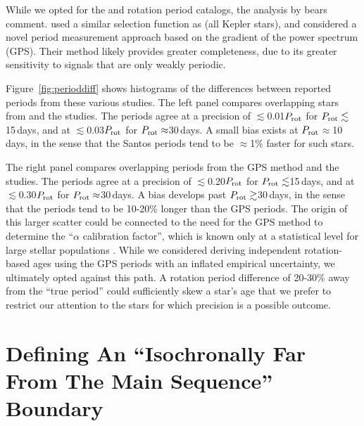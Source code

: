\documentclass[11pt,twocolumn,tighten,linenumbers,trackchanges]{aastex63}
\begin{document}
While we opted for the  and
 rotation period catalogs, the analysis 
by \citet{Reinhold2023} bears comment.  \citet{Reinhold2023}
used a similar selection function as \citeauthor{Santos_2021}
(all Kepler stars), and considered a novel period measurement
approach based on the gradient of the power spectrum (GPS).  Their method
likely provides greater completeness, due to its greater sensitivity
to signals that are only weakly periodic.  

Figure~\ref{fig:perioddiff} shows histograms of the differences
between reported periods from these various studies.  The left panel
compares overlapping stars from \citet{McQuillan_2014} and
the \citeauthor{Santos_2021} studies.  The periods agree at a precision of
$\lesssim$0.01$P_{\rm rot}$ for $P_{\rm rot}\lesssim$15\,days, and at
$\lesssim$0.03$P_{\rm rot}$ for $P_{\rm rot}\approx$30\,days.  
A small bias exists at $P_{\rm rot}$$\approx$10\,days,
in the sense that the Santos periods tend to be $\approx$1\% faster
for such stars.

The right panel compares overlapping periods from the
\citet{Reinhold2023} GPS method and the \citeauthor{Santos_2021} studies.  The
periods agree at a precision of $\lesssim$0.20$P_{\rm rot}$ for
$P_{\rm rot}\lesssim$15\,days, and at $\lesssim$0.30$P_{\rm rot}$ for
$P_{\rm rot}\approx$30\,days.  A  bias develops past $P_{\rm
rot}\gtrsim$30\,days, in the sense that the \citeauthor{Santos_2021}
periods tend to be 10-20\% longer than the GPS periods.  The origin of
this larger scatter could be connected to the need for the GPS method
to determine the ``$\alpha$ calibration factor'', which is known only
at a statistical level for large stellar populations
\citep[see][]{Reinhold2023}.  While we considered deriving independent
rotation-based ages using the \citet{Reinhold2023} GPS periods with an
inflated empirical uncertainty, we ultimately opted against this path.
A rotation period difference of 20-30\% away from the ``true period''
could sufficiently skew a star's age that we prefer to restrict our
attention to the stars for which precision is a possible
outcome.





\section{Defining An ``Isochronally Far From The Main Sequence'' Boundary}
\label{app:linemethod}
\end{document}

